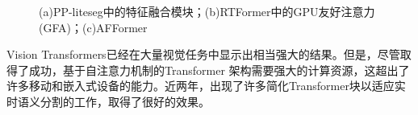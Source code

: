 \documentclass[11pt]{article}
\begin{document}
\begin{figure}[!h]
    \centering

    \centering
    \caption{(a)PP-liteseg\cite{ref28}中的特征融合模块；(b)RTFormer\cite{ref30}中的GPU友好注意力(GFA)；(c)AFFormer\cite{aff}}
\end{figure}
Vision Transformers已经在大量视觉任务中显示出相当强大的结果。但是，尽管取得了成功，基于自注意力机制的Transformer 架构需要强大的计算资源，这超出了许多移动和嵌入式设备的能力。近两年，出现了许多简化Transformer块以适应实时语义分割的工作，取得了很好的效果。
\end{document}
